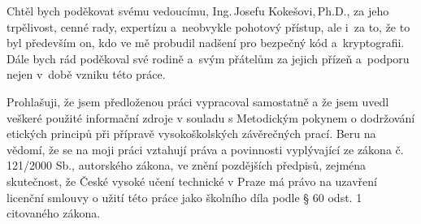 \documentclass[czech,bachelor,unicode,twoside,hyphens]{ctufit-thesis}
\theoremstyle{plain}
\theoremstyle{definition}
\theoremstyle{remark}
\numberwithin{theorem}{chapter}
\begin{document}
 
\frontmatter\frontmatterinit %


\thispagestyle{empty}\cleardoublepage\maketitle %

\imprintpage %

\tableofcontents %
\listoffigures %
\begingroup
\let\clearpage\relax
\listoftables %
\lstlistoflistings %
\endgroup

\begin{acknowledgmentpage}
    Chtěl bych poděkovat svému vedoucímu, Ing.\,Josefu Kokešovi,\,Ph.D., za jeho trpělivost, cenné rady, expertízu a~neobvykle pohotový přístup, ale i~za to, že to byl především on, kdo ve mě probudil nadšení pro bezpečný kód a~kryptografii. Dále bych rád poděkoval své rodině a~svým přátelům za jejich přízeň a~podporu nejen v~době vzniku této práce.
\end{acknowledgmentpage} 


\begin{declarationpage}
Prohlašuji, že jsem předloženou práci vypracoval samostatně a že jsem uvedl veškeré použité informační zdroje v souladu s Metodickým pokynem o dodržování etických principů při přípravě vysokoškolských závěrečných prací. Beru na vědomí, že se na moji práci vztahují práva a povinnosti vyplývající ze zákona č. 121/2000 Sb., autorského zákona, ve znění pozdějších předpisů, zejména skutečnost, že České vysoké učení technické v Praze má právo na uzavření licenční smlouvy o užití této práce jako školního díla podle § 60 odst. 1 citovaného zákona.
\end{declarationpage}
\end{document}
